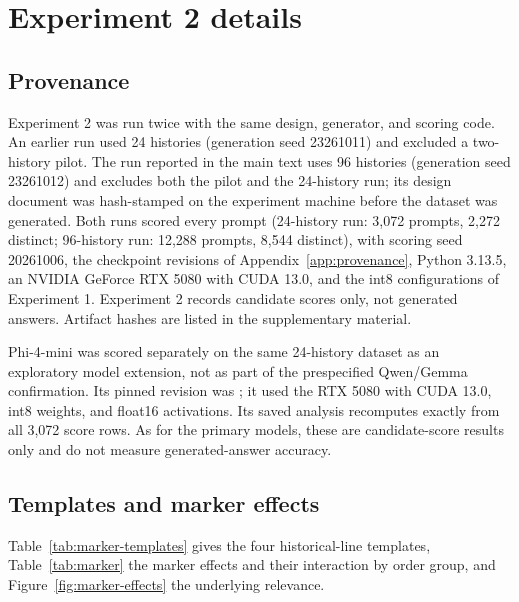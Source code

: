\section{Experiment 2 details}
\label{app:marker}

\subsection{Provenance}

Experiment 2 was run twice with the same design, generator, and scoring code. An earlier run used 24 histories (generation seed 23261011) and excluded a two-history pilot. The run reported in the main text uses 96 histories (generation seed 23261012) and excludes both the pilot and the 24-history run; its design document was hash-stamped on the experiment machine before the dataset was generated. Both runs scored every prompt (24-history run: 3,072 prompts, 2,272 distinct; 96-history run: 12,288 prompts, 8,544 distinct), with scoring seed 20261006, the checkpoint revisions of Appendix~\ref{app:provenance}, Python 3.13.5, an NVIDIA GeForce RTX 5080 with CUDA 13.0, and the int8 configurations of Experiment 1. Experiment 2 records candidate scores only, not generated answers. Artifact hashes are listed in the supplementary material.

Phi-4-mini was scored separately on the same 24-history dataset as an exploratory model extension, not as part of the prespecified Qwen/Gemma confirmation. Its pinned revision was ; it used the RTX 5080 with CUDA 13.0, int8 weights, and float16 activations. Its saved analysis recomputes exactly from all 3,072 score rows. As for the primary models, these are candidate-score results only and do not measure generated-answer accuracy.

\subsection{Templates and marker effects}

Table~\ref{tab:marker-templates} gives the four historical-line templates, Table~\ref{tab:marker} the marker effects and their interaction by order group, and Figure~\ref{fig:marker-effects} the underlying relevance.

